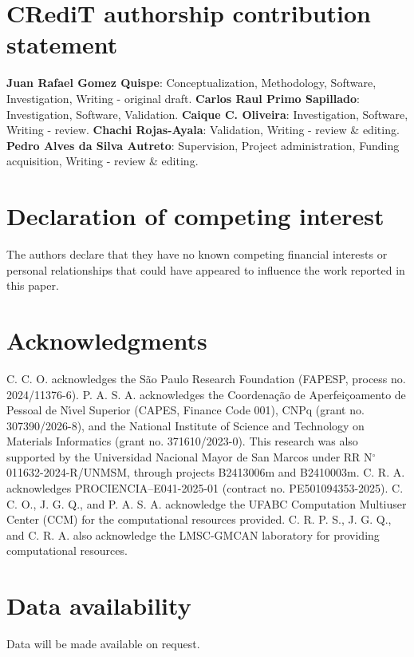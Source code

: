 \documentclass[journal=jacsat,manuscript=article]{achemso}
\begin{document}
\section*{CRediT authorship contribution statement}
\begin{sloppypar}
    \textbf{Juan Rafael Gomez Quispe}: Conceptualization, Methodology, Software, Investigation, Writing - original draft. \textbf{Carlos Raul Primo Sapillado}: Investigation, Software, Validation. \textbf{Caique C. Oliveira}: Investigation, Software, Writing - review. \textbf{Chachi Rojas-Ayala}: Validation, Writing - review \& editing. \textbf{Pedro Alves da Silva Autreto}: Supervision, Project administration, Funding acquisition, Writing - review \& editing.
\end{sloppypar}

\section*{Declaration of competing interest}
The authors declare that they have no known competing financial interests or personal relationships that could have appeared to influence the work reported in this paper.

\section*{Acknowledgments}

\begin{sloppypar}
C. C. O. acknowledges the S\~ao Paulo Research Foundation (FAPESP, process no. 2024/11376-6). P. A. S. A. acknowledges the Coordena\c{c}\~ao de Aperfei\c{c}oamento de Pessoal de N\'{\i}vel Superior (CAPES, Finance Code 001), CNPq (grant no. 307390/2026-8), and the National Institute of Science and Technology on Materials Informatics (grant no. 371610/2023-0). This research was also supported by the Universidad Nacional Mayor de San Marcos under RR N$^\circ$ 011632-2024-R/UNMSM, through projects B2413006m and B2410003m. C. R. A. acknowledges PROCIENCIA--E041-2025-01 (contract no. PE501094353-2025). C. C. O., J. G. Q., and P. A. S. A. acknowledge the UFABC Computation Multiuser Center (CCM) for the computational resources provided. C. R. P. S., J. G. Q., and C. R. A. also acknowledge the LMSC-GMCAN laboratory for providing computational resources.
\end{sloppypar}

\section*{Data availability}

Data will be made available on request.


\end{document}
